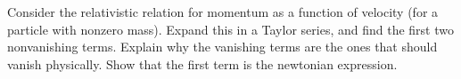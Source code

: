 Consider the relativistic relation for momentum as a function of velocity
(for a particle with nonzero mass).
Expand this in a Taylor series, and find the
first two nonvanishing terms. 
Explain why the vanishing terms are
the ones that should vanish physically.
Show that the first term is the newtonian
expression.
